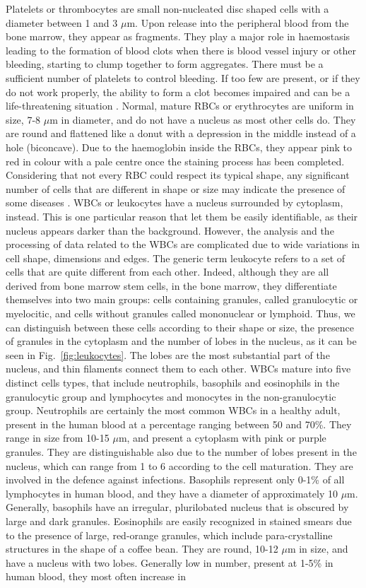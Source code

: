 \documentclass[final,a4paper,12pt,english]{UnicaPhdThesis3}
\begin{document}
	Platelets or thrombocytes are small non-nucleated disc shaped cells with a diameter between 1 and 3 $\mu$m. Upon release into the peripheral blood from the bone marrow, they appear as fragments. They play a major role in haemostasis leading to the formation of blood clots when there is blood vessel injury or other bleeding, starting to clump together to form aggregates. There must be a sufficient number of platelets to control bleeding. If too few are present, or if they do not work properly, the ability to form a clot becomes impaired and can be a life-threatening situation \cite{Ciesla}. Normal, mature RBCs or erythrocytes are uniform in size, 7-8 $\mu$m in diameter,  and do not have a nucleus as most other cells do. They are round and flattened like a donut with a depression in the middle instead of a hole (biconcave). Due to the haemoglobin inside the RBCs, they appear pink to red in colour with a pale centre once the staining process has been completed. Considering that not every RBC could respect its typical shape, any significant number of cells that are different in shape or size may indicate the presence of some diseases \cite{Erhabor}. WBCs or leukocytes have a nucleus surrounded by cytoplasm, instead. This is one particular reason that let them be easily identifiable, as their nucleus appears darker than the background. However, the analysis and the processing of data related to the WBCs are complicated due to wide variations in cell shape, dimensions and edges. The generic term leukocyte refers to a set of cells that are quite different from each other. Indeed, although they are all derived from bone marrow stem cells, in the bone marrow, they differentiate themselves into two main groups: cells containing granules, called granulocytic or myelocitic, and cells without granules called mononuclear or lymphoid. Thus, we can distinguish between these cells according to their shape or size, the presence of granules in the cytoplasm and the number of lobes in the nucleus, as it can be seen in Fig.~\ref{fig:leukocytes}. The lobes are the most substantial part of the nucleus, and thin filaments connect them to each other. WBCs mature into five distinct cells types, that include neutrophils, basophils and eosinophils in the granulocytic group and lymphocytes and monocytes in the non-granulocytic group. Neutrophils are certainly the most common WBCs in a healthy adult, present in the human blood at a percentage ranging between 50 and 70\%. They range in size from 10-15 $\mu$m, and present a cytoplasm with pink or purple granules. They are distinguishable also due to the number of lobes present in the nucleus, which can range from 1 to 6 according to the cell maturation. They are involved in the defence against infections. Basophils represent only 0-1\% of all lymphocytes in human blood, and they have a diameter of approximately 10 $\mu$m. Generally, basophils have an irregular, plurilobated nucleus that is obscured by large and dark granules. Eosinophils are easily recognized in stained smears due to the presence of large, red-orange granules, which include para-crystalline structures in the shape of a coffee bean. They are round, 10-12 $\mu$m in size, and have a nucleus with two lobes. Generally low in number, present at 1-5\% in human blood, they most often increase in 
\end{document}
